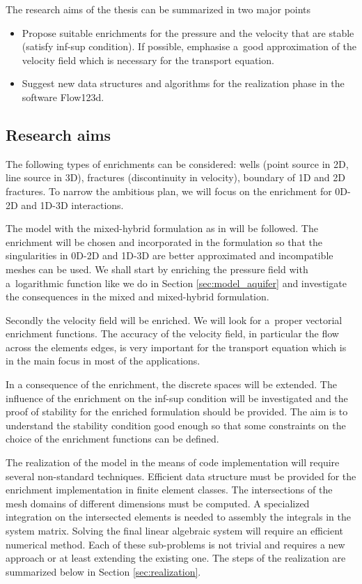 \documentclass[bibliography=totocnumbered,dvipsnames,FM,Dis]{tulthesis_autoreferat}
\begin{document}
The research aims of the thesis can be summarized in two major points
\begin{itemize}
  \item Propose suitable enrichments for the pressure and the velocity that are stable (satisfy inf-sup condition). 
        If possible, emphasise a~good approximation of the velocity field which is necessary for the transport equation.
        
  \item Suggest new data structures and algorithms for the realization phase in the software Flow123d. 
\end{itemize}

\subsection{Research aims}

The following types of enrichments can be considered: wells (point source in 2D, line source in 3D), 
fractures (discontinuity in velocity), boundary of 1D and 2D fractures. 
To narrow the ambitious plan, we will focus on the enrichment for 0D-2D and 1D-3D interactions.

The model with the mixed-hybrid formulation as in \cite{brezina_mixed-hybrid_2010, sistek_bddc_2015} will be followed.
The enrichment will be chosen and incorporated in the formulation so that the singularities in 0D-2D and
1D-3D are better approximated and incompatible meshes can be used. 
We shall start by enriching the pressure field with a~logarithmic function like we
do in Section \ref{sec:model_aquifer} and investigate the consequences in the mixed and mixed-hybrid formulation.

Secondly the velocity field will be enriched. We will look for a~proper vectorial enrichment functions.
The accuracy of the velocity field, in particular the flow across the elements edges, is very important for
the transport equation which is in the main focus in most of the applications.

In a consequence of the enrichment, the discrete spaces will be extended. The influence of the enrichment on the inf-sup 
condition will be investigated and the proof of stability for the enriched formulation should be provided.
The aim is to understand the stability condition good enough so that some constraints on the choice of the enrichment 
functions can be defined. 

The realization of the model in the means of code implementation will require several non-standard techniques.
Efficient data structure must be provided for the enrichment implementation in finite element classes.
The intersections of the mesh domains of different dimensions must be computed. A specialized integration
on the intersected elements is needed to assembly the integrals in the system matrix. 
Solving the final linear algebraic system will require an efficient numerical method.
Each of these sub-problems is not trivial and requires a new approach or at least extending the existing one.
The steps of the realization are summarized below in Section \ref{sec:realization}.
\end{document}
